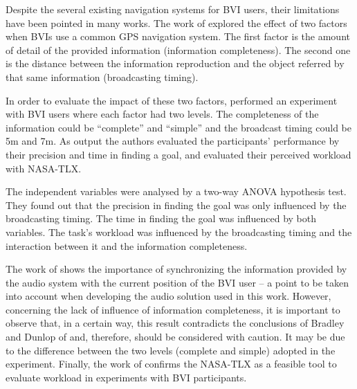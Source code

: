 Despite the several existing navigation systems for BVI users, their limitations have been pointed in many works. The work of  explored the effect of two factors when BVIs use a common GPS navigation system. The first factor is the amount of detail of the provided information (information completeness). The second one is the distance between the information reproduction and the object referred by that same information (broadcasting timing).

In order to evaluate the impact of these two factors,  performed an experiment with BVI users where each factor had two levels. The completeness of the information could be “complete” and “simple” and the broadcast timing could be 5m and 7m. As output the authors evaluated the participants’ performance by their precision and time in finding a goal, and evaluated their perceived workload with NASA-TLX. 

The independent variables were analysed by a two-way ANOVA hypothesis test. They found out that the precision in finding the goal was only influenced by the broadcasting timing. The time in finding the goal was influenced by both variables. The task’s workload was influenced by the broadcasting timing and the interaction between it and the information completeness.

The work of  shows the importance of synchronizing the information provided by the audio system with the current position of the BVI user – a point to be taken into account when developing the audio solution used in this work. However, concerning the lack of influence of information completeness, it is important to observe that, in a certain way, this result contradicts the conclusions of Bradley and Dunlop of \citeyear{bradley2002investigating,bradley2005experimental} and, therefore, should be considered with caution. It may be due to the difference between the two levels (complete and simple) adopted in the experiment. Finally, the work of  confirms the NASA-TLX as a feasible tool to evaluate workload in experiments with BVI participants.
